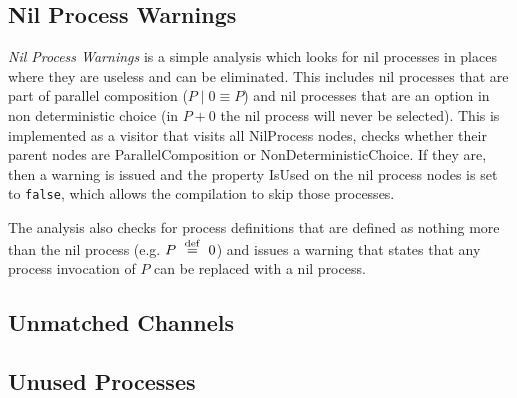 \subsection{Nil Process Warnings}

	\textit{Nil Process Warnings} is a simple analysis which looks for nil processes 
	in places where they are useless and can be eliminated. This includes nil processes
	that are part of parallel composition ($P \mid 0 \equiv P$) and nil processes that
	are an option in non deterministic choice (in $P+0$ the nil process will never
	be selected). This is implemented as a visitor that visits all \textsf{NilProcess}
	nodes, checks whether their parent nodes are \textsf{ParallelComposition} or 
	\textsf{NonDeterministicChoice}. If they are, then a warning is issued and the
	property \textsf{IsUsed} on the nil process nodes is set to \texttt{false}, which
	allows the compilation to skip those processes.
	
	The analysis also checks for process definitions that are defined as nothing more
	than the nil process (e.g. $P \ \stackrel{\mathrm{def}}{=}\  0$) and issues a warning that states that
	any process invocation of $P$ can be replaced with a nil process.

\subsection{Unmatched Channels}

\subsection{Unused Processes}

	


	